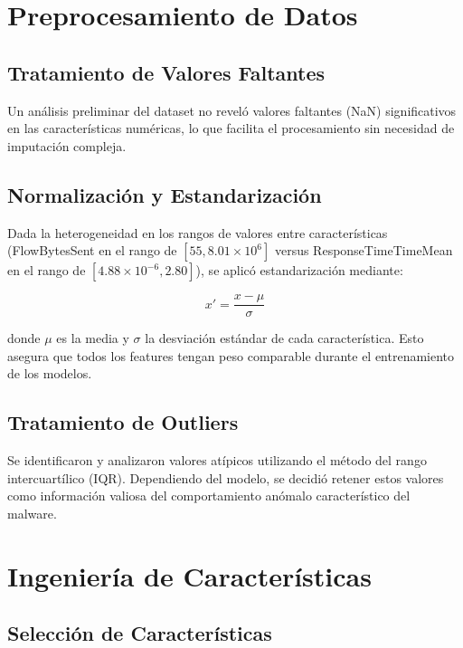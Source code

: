 \section{Preprocesamiento de Datos}\label{sec:preprocesamiento}

\subsection{Tratamiento de Valores Faltantes}

Un análisis preliminar del dataset no reveló valores faltantes (NaN) significativos en las características numéricas, lo que facilita el procesamiento sin necesidad de imputación compleja.

\subsection{Normalización y Estandarización}

Dada la heterogeneidad en los rangos de valores entre características (FlowBytesSent en el rango de $[55, 8.01 \times 10^6]$ versus ResponseTimeTimeMean en el rango de $[4.88 \times 10^{-6}, 2.80]$), se aplicó estandarización mediante:

\[
x' = \frac{x - \mu}{\sigma}
\]

donde $\mu$ es la media y $\sigma$ la desviación estándar de cada característica. Esto asegura que todos los features tengan peso comparable durante el entrenamiento de los modelos.

\subsection{Tratamiento de Outliers}

Se identificaron y analizaron valores atípicos utilizando el método del rango intercuartílico (IQR). Dependiendo del modelo, se decidió retener estos valores como información valiosa del comportamiento anómalo característico del malware.

\section{Ingeniería de Características}\label{sec:ingenieria_caracteristicas}

\subsection{Selección de Características}

